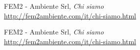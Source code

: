 \begin{thebibliography}{99}

	FEM2 - Ambiente Srl, \emph{Chi siamo} \\
	\url{http://fem2ambiente.com/it/chi-siamo.html}

	FEM2 - Ambiente Srl, \emph{Chi siamo} \\
	\url{http://fem2ambiente.com/it/chi-siamo.html}

\end{thebibliography}